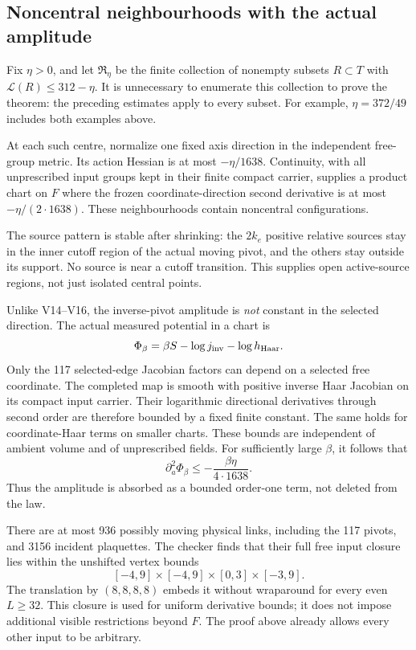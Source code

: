\documentclass[11pt,oneside]{article}
\begin{document}
\subsection{Noncentral neighbourhoods with the actual amplitude}

Fix \(\eta>0\), and let \(\mathfrak R_\eta\) be the
finite collection of nonempty subsets \(R\subset T\)
with \(\mathcal L(R)\le312-\eta\). It is unnecessary
to enumerate this collection to prove the theorem:
the preceding estimates apply to every subset.
For example, \(\eta=372/49\) includes both examples above.

At each such centre, normalize one fixed axis
direction in the independent free-group metric.
Its action Hessian is at most \(-\eta/1638\).
Continuity, with all unprescribed input groups
kept in their finite compact carrier, supplies
a product chart on \(F\) where the frozen
coordinate-direction second derivative is at most
\(-\eta/(2\cdot1638)\). These neighbourhoods
contain noncentral configurations.

The source pattern is stable after shrinking:
the \(2k_e\) positive relative sources stay in
the inner cutoff region of the actual moving
pivot, and the others stay outside its support.
No source is near a cutoff transition.
This supplies open active-source regions, not
just isolated central points.

Unlike V14--V16, the inverse-pivot amplitude is
\emph{not} constant in the selected direction.
The actual measured potential in a chart is
\[
 \Phi_\beta=\beta S-\log j_{\rm inv}-\log h_{\rm Haar}.
\]
Only the 117 selected-edge Jacobian factors can
depend on a selected free coordinate. The completed
map is smooth with positive inverse Haar Jacobian
on its compact input carrier. Their logarithmic
directional derivatives through second order are
therefore bounded by a fixed finite constant.
The same holds for coordinate-Haar terms on
smaller charts. These bounds are independent of
ambient volume and of unprescribed fields.
For sufficiently large \(\beta\), it follows that
\[
                   \partial_a^2\Phi_\beta
                           \le-\frac{\beta\eta}{4\cdot1638}.
\]
Thus the amplitude is absorbed as a bounded
order-one term, not deleted from the law.

There are at most 936 possibly moving physical
links, including the 117 pivots, and 3156 incident
plaquettes. The checker finds that their full free
input closure lies within the unshifted vertex bounds
\[
 [-4,9]\times[-4,9]\times[0,3]\times[-3,9].
\]
The translation by \((8,8,8,8)\) embeds it without
wraparound for every even \(L\ge32\).
This closure is used for uniform derivative bounds;
it does not impose additional visible restrictions
beyond \(F\). The proof above already allows
every other input to be arbitrary.
\end{document}
